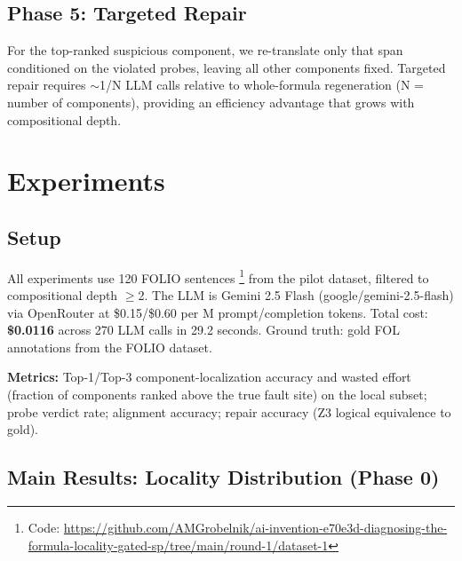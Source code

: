 \documentclass[11pt,letterpaper]{article}
\begin{document}
\subsection{Phase 5: Targeted Repair}

For the top-ranked suspicious component, we re-translate only that span conditioned on the violated probes, leaving all other components fixed. Targeted repair requires $\sim$1/N LLM calls relative to whole-formula regeneration (N = number of components), providing an efficiency advantage that grows with compositional depth.

\section{Experiments}

\subsection{Setup}

All experiments use 120 FOLIO sentences \citep{Han2022}%
\footnote{Code: \url{https://github.com/AMGrobelnik/ai-invention-e70e3d-diagnosing-the-formula-locality-gated-sp/tree/main/round-1/dataset-1}}
from the pilot dataset, filtered to compositional depth $\geq$2. The LLM is Gemini 2.5 Flash (google/gemini-2.5-flash) via OpenRouter at \$0.15/\$0.60 per M prompt/completion tokens. Total cost: \textbf{\$0.0116} across 270 LLM calls in 29.2 seconds. Ground truth: gold FOL annotations from the FOLIO dataset.

\textbf{Metrics:} Top-1/Top-3 component-localization accuracy and wasted effort (fraction of components ranked above the true fault site) on the local subset; probe verdict rate; alignment accuracy; repair accuracy (Z3 logical equivalence to gold).

\subsection{Main Results: Locality Distribution (Phase 0)}
\end{document}
